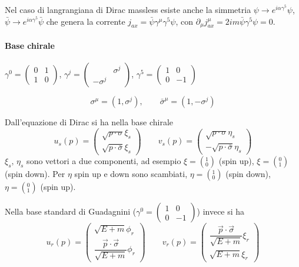 \documentclass[12pt,a4paper]{article}
\begin{document}
	Nel caso di langrangiana di Dirac massless esiste anche la simmetria $\psi\rightarrow e^{i\alpha \gamma^5} \psi$, $\bar{\psi}\rightarrow e^{i\alpha \gamma^5} \bar{\psi}$ che genera la corrente $j_{ax} = \bar{\psi}\gamma^\mu\gamma^5\psi$, con $\partial_\mu j_{ax}^\mu = 2im\bar{\psi}\gamma^5\psi = 0$.
	
	\paragraph{Base chirale}
	
	$\gamma^0 = \begin{pmatrix}
	0&1\\1&0
	\end{pmatrix}$, $\gamma^j = \begin{pmatrix}
	&\sigma^j\\-\sigma^j&
	\end{pmatrix}$, $\gamma^5 = \begin{pmatrix}
	1&0\\0&-1
	\end{pmatrix}$
	
	\[ \sigma^\mu = (1, \sigma^j),\qquad \bar{\sigma}^\mu = (1,-\sigma^j) \]
	
	Dall'equazione di Dirac si ha nella base chirale
	\[ u_s(p) = \begin{pmatrix}
	\sqrt{p\cdot \sigma}\xi_s\\ \sqrt{p\cdot \bar{\sigma}} \xi_s
	\end{pmatrix}
	\qquad
	v_s(p) = \begin{pmatrix}
	\sqrt{p\cdot \sigma}\eta_s\\ -\sqrt{p\cdot \bar{\sigma}} \eta_s
	\end{pmatrix} \]
	$\xi_s,\,\eta_s$ sono vettori a due componenti, ad esempio $\xi = \left( ^{1}_{0} \right)$ (spin up), $\xi = \left( ^{0}_{1} \right)$ (spin down). Per $\eta$ spin up e down sono scambiati, $\eta = \left( ^{1}_{0} \right)$ (spin down), $\eta = \left( ^{0}_{1} \right)$ (spin up).
	
	Nella base standard di Guadagnini ($\gamma^0 = \begin{pmatrix}
	1&0\\0&-1
	\end{pmatrix}$) invece si ha
	\[ u_r(p) = \begin{pmatrix}
	\sqrt{E+m}\phi_r\\ \dfrac{\vec{p}\cdot\vec{\sigma}}{\sqrt{E+m}} \phi_r
	\end{pmatrix}
	\qquad
	v_r(p) = \begin{pmatrix}
	\dfrac{\vec{p}\cdot\vec{\sigma}}{\sqrt{E+m}} \xi_r \\ \sqrt{E+m} \xi_r
	\end{pmatrix} \]
	
\end{document}
